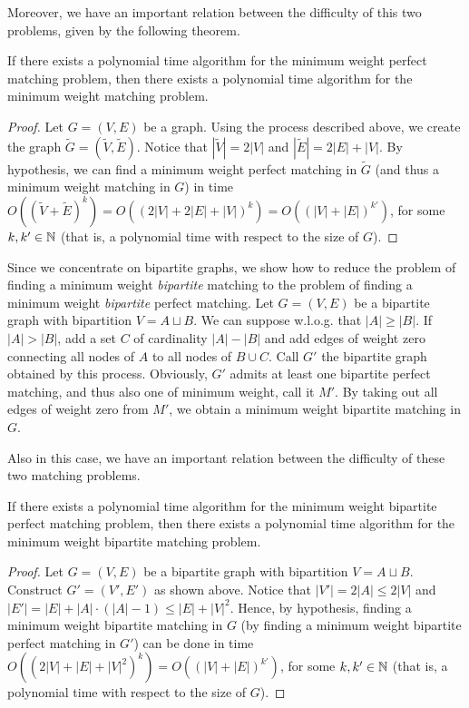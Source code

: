 Moreover, we have an important relation between the difficulty
of this two problems, given by the following theorem.

\begin{theorem}
   If there exists a polynomial time algorithm for the minimum
   weight perfect matching problem, then there exists a polynomial 
   time algorithm for the minimum weight matching problem.
\end{theorem}

\begin{proof}
   Let $G=(V,E)$ be a graph. Using the process described above,
   we create the graph $\tilde{G} = (\tilde{V}, \tilde{E})$.
   Notice that $|\tilde{V}| = 2|V|$ and 
   $|\tilde{E}| = 2|E|+|V|$.
   By hypothesis, we can find a minimum weight perfect 
   matching in $\tilde{G}$ (and thus a minimum weight matching
   in $G$) in time $O((\tilde{V} + \tilde{E})^k) =
                    O((2|V|+2|E|+|V|)^k) = O((|V|+|E|)^{k'})$,
   for some $k,k' \in \mathbb{N}$ (that is, a polynomial time with 
   respect to the size of $G$).
\end{proof}

Since we concentrate on bipartite graphs, we show
how to reduce the problem of finding a minimum weight 
\emph{bipartite} matching to the problem of finding a minimum
weight \emph{bipartite} perfect matching. Let $G=(V,E)$ be a 
bipartite graph with bipartition $V = A \sqcup B$. We can
suppose w.l.o.g. that $|A| \geq |B|$. If $|A|>|B|$, add a
set $C$ of cardinality $|A|-|B|$ and add edges of weight 
zero connecting all nodes of $A$ to all nodes of $B \cup C$.
Call $G'$ the bipartite graph obtained by this process. Obviously,
$G'$ admits at least one bipartite perfect matching, and thus 
also one of minimum weight, call it $M'$. 
By taking out all edges of weight zero from $M'$, we obtain a
minimum weight bipartite matching in $G$.

Also in this case, we have an important relation between
the difficulty of these two matching problems.

\begin{theorem}
   If there exists a polynomial time algorithm for the minimum
   weight bipartite perfect matching problem, then there exists a 
   polynomial time algorithm for the minimum weight bipartite 
   matching problem.
\end{theorem}

\begin{proof}
   Let $G=(V,E)$ be a bipartite graph with bipartition 
   $V = A \sqcup B$. Construct $G'=(V',E')$ as shown above.
   Notice that $|V'| = 2|A| \leq 2|V|$ and 
   $|E'| = |E| + |A| \cdot (|A|-1) \leq |E| + |V|^2$.
   Hence, by hypothesis, finding a minimum weight bipartite 
   matching in $G$ (by finding a minimum weight bipartite perfect 
   matching in $G'$) can be done in time $O((2|V| + |E| + |V|^2)^k)
   = O((|V|+|E|)^{k'})$, for some $k,k' \in \mathbb{N}$ (that is, a 
   polynomial time with respect to the size of $G$).
\end{proof}

